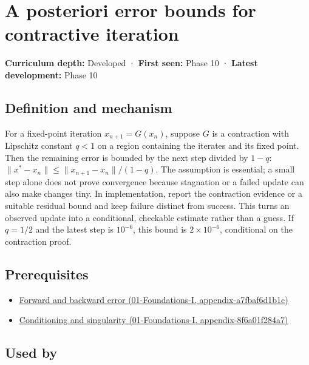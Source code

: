 \hypertarget{appendix-d83b0ad1be7f}{}
\section{A posteriori error bounds for contractive iteration}\label{appendix-d83b0ad1be7f-a-posteriori-error-bounds-for-contractive-iteration}

\textbf{Curriculum depth:} Developed · \textbf{First seen:} Phase 10 · \textbf{Latest development:} Phase 10

\subsection{Definition and mechanism}\label{appendix-d83b0ad1be7f-definition-and-mechanism}

For a fixed-point iteration \(x_{n+1}=G(x_n)\), suppose \(G\) is a contraction with Lipschitz constant \(q<1\) on a region containing the iterates and its fixed point. Then the remaining error is bounded by the next step divided by \(1-q\): \(\|x^*-x_n\|\le\|x_{n+1}-x_n\|/(1-q)\). The assumption is essential; a small step alone does not prove convergence because stagnation or a failed update can also make changes tiny. In implementation, report the contraction evidence or a suitable residual bound and keep failure distinct from success. This turns an observed update into a conditional, checkable estimate rather than a guess. If \(q=1/2\) and the latest step is \(10^{-6}\), this bound is \(2\times10^{-6}\), conditional on the contraction proof.

\subsection{Prerequisites}\label{appendix-d83b0ad1be7f-prerequisites}

\begin{itemize}
\tightlist
\item
  \href{../01-Foundations-I/main.pdf\#nameddest=appendix-a7fbaf6d1b1c}{Forward and backward error (01-Foundations-I, appendix-a7fbaf6d1b1c)}
\item
  \href{../01-Foundations-I/main.pdf\#nameddest=appendix-8f6a01f284a7}{Conditioning and singularity (01-Foundations-I, appendix-8f6a01f284a7)}
\end{itemize}

\subsection{Used by}\label{appendix-d83b0ad1be7f-used-by}

